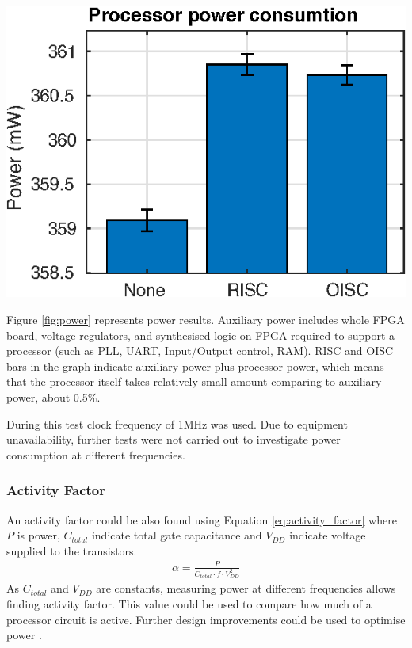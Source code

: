 \begin{colfigure}
	\centering
	\includegraphics[width=\linewidth]{../tests/power.eps}
	\label{fig:power}
\end{colfigure}

Figure \ref{fig:power} represents power results. Auxiliary power includes whole FPGA board, voltage regulators, and synthesised logic on FPGA required to support a processor (such as PLL, UART, Input/Output control, RAM). RISC and OISC bars in the graph indicate auxiliary power plus processor power, which means that the processor itself takes relatively small amount comparing to auxiliary power, about 0.5\%.

During this test clock frequency of 1MHz was used. Due to equipment unavailability, further tests were not carried out to investigate power consumption at different frequencies. 

\subsubsection{Activity Factor}
An activity factor could be also found using Equation \ref{eq:activity_factor} where $P$ is power, $C_{total}$ indicate total gate capacitance and $V_{DD}$ indicate voltage supplied to the transistors.
\begin{align}\label{eq:activity_factor}
\alpha = \frac{P}{C_{total}\cdot f \cdot V_{DD}^2}
\end{align}
As $C_{total}$ and $V_{DD}$ are constants, measuring power at different frequencies allows finding activity factor. This value could be used to compare how much of a processor circuit is active. Further design improvements could be used to optimise power \autocite{8682289,7363689,1207041,6972455}.


